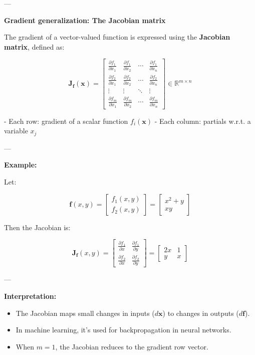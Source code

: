 ---

\textbf{Gradient generalization: The Jacobian matrix}

The gradient of a vector-valued function is expressed using the \textbf{Jacobian matrix}, defined as:

\[
\mathbf{J}_{\mathbf{f}}(\mathbf{x}) =
\begin{bmatrix}
\frac{\partial f_1}{\partial x_1} & \frac{\partial f_1}{\partial x_2} & \cdots & \frac{\partial f_1}{\partial x_n} \\
\frac{\partial f_2}{\partial x_1} & \frac{\partial f_2}{\partial x_2} & \cdots & \frac{\partial f_2}{\partial x_n} \\
\vdots & \vdots & \ddots & \vdots \\
\frac{\partial f_m}{\partial x_1} & \frac{\partial f_m}{\partial x_2} & \cdots & \frac{\partial f_m}{\partial x_n}
\end{bmatrix}
\in \mathbb{R}^{m \times n}
\]

- Each row: gradient of a scalar function \( f_i(\mathbf{x}) \)
- Each column: partials w.r.t. a variable \( x_j \)

---

\textbf{Example:}

Let:

\[
\mathbf{f}(x, y) = 
\begin{bmatrix}
f_1(x, y) \\
f_2(x, y)
\end{bmatrix}
=
\begin{bmatrix}
x^2 + y \\
xy
\end{bmatrix}
\]

Then the Jacobian is:

\[
\mathbf{J}_{\mathbf{f}}(x, y) =
\begin{bmatrix}
\frac{\partial f_1}{\partial x} & \frac{\partial f_1}{\partial y} \\
\frac{\partial f_2}{\partial x} & \frac{\partial f_2}{\partial y}
\end{bmatrix}
=
\begin{bmatrix}
2x & 1 \\
y & x
\end{bmatrix}
\]

---

\textbf{Interpretation:}
\begin{itemize}
    \item The Jacobian maps small changes in inputs (\(d\mathbf{x}\)) to changes in outputs (\(d\mathbf{f}\)).
    \item In machine learning, it's used for backpropagation in neural networks.
    \item When \( m = 1 \), the Jacobian reduces to the gradient row vector.
\end{itemize}

